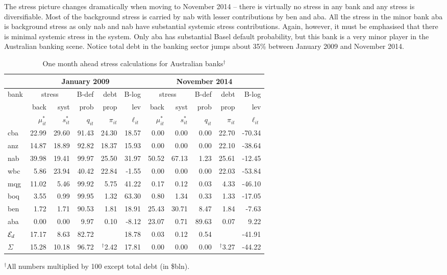 \documentclass[authoryear]{elsarticle}
\newcommand{\Ex}{{\cal E}}
\begin{document}
 The stress picture  changes dramatically when moving to November 2014 -- there is virtually no stress in any bank and any stress is diversifiable.    Most of the  background stress is carried by nab with lesser contributions by ben and aba.    All the stress in the minor bank aba is background stress as only nab and nab have substantial systemic stress contributions.   Again, however, it must be emphasised that there is minimal systemic stress in the system.    Only aba has substantial Basel default probability, but this bank is a very minor player in the Australian banking scene.   Notice total debt in the banking sector  jumps about 35\% between January 2009 and November 2014.

\begin{table}[ht]
\caption{One month ahead stress calculations for Australian banks$^\dag$}\label{twodates}
\centering
\small
\vspace{4mm}
\begin{tabular}{l|rrrrr|rrrrr}
\hline
&\multicolumn{5}{c|}{January 2009}&\multicolumn{5}{c}{November 2014}\\
  \hline
bank & \multicolumn{2}{c}{stress} & B-def & debt & B-log& \multicolumn{2}{c}{stress} & B-def & debt & B-log \\
  \cline{2-3}\cline{7-8}
           & back & syst & prob & prop & lev& back & syst & prob & prop & lev \\
  \cline{2-11} 
            & $\mu^*_{it}$  & $s^*_{it}$ & $q_{it}$ & $\pi_{it}$ & $\ell_{it}$
        & $\mu^*_{it}$  & $s^*_{it}$ & $q_{it}$ & $\pi_{it}$ & $\ell_{it}$ 
        \\
  \hline
cba & 22.99 & 29.60 & 91.43 & 24.30 & 18.57 & 0.00 & 0.00 & 0.00 & 22.70 & -70.34 \\ 
anz & 14.87 & 18.89 & 92.82 & 18.37 & 15.93 & 0.00 & 0.00 & 0.00 & 22.10 & -38.64 \\ 
nab & 39.98 & 19.41 & 99.97 & 25.50 & 31.97 & 50.52 & 67.13 & 1.23 & 25.61 & -12.45 \\ 
wbc & 5.86 & 23.94 & 40.42 & 22.84 & -1.55 & 0.00 & 0.00 & 0.00 & 22.03 & -53.84 \\ 
mqg & 11.02 & 5.46 & 99.92 & 5.75 & 41.22 & 0.17 & 0.12 & 0.03 & 4.33 & -46.10 \\ 
boq & 3.55 & 0.99 & 99.95 & 1.32 & 63.30 & 0.80 & 1.34 & 0.33 & 1.33 & -17.05 \\ 
ben & 1.72 & 1.71 & 90.53 & 1.81 & 18.91 & 25.43 & 30.71 & 8.47 & 1.84 & -7.63 \\ 
aba & 0.00 & 0.00 & 9.97 & 0.10 & -8.12 & 23.07 & 0.71 & 89.63 & 0.07 & 9.22 \\ 
  \hline
$\Ex_d$ & 17.17 & 8.63 & 82.72 &  & 18.78 & 0.03 & 0.12 & 0.54 &  & -41.91 \\ 
$\Sigma$ & 15.28 & 10.18 & 96.72 & $^\dag$2.42 & 17.81 & 0.00 & 0.00 & 0.00 & $^\dag$3.27 & -44.22 \\ 
\hline
\end{tabular}
\normalsize
\end{table}
\small{$^\dag$All numbers multiplied by 100 except total debt (in \$bln).}
\end{document}
